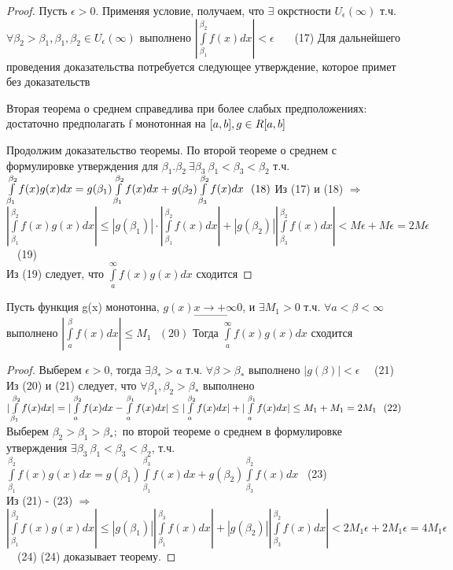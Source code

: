 \begin{proof}
	Пусть $\epsilon > 0$. Применяя условие, получаем, что $\exists$ окрстности $U_\epsilon(\infty)$ т.ч. $\forall \beta_2 > \beta_1, \beta_1,\beta_2 \in U_\epsilon(\infty)$ выполнено $|\int\limits_{\beta_1}^{\beta_2}{f(x)}dx| < \epsilon$  \ \ \ (17)
Для дальнейшего проведения доказательства потребуется следующее утверждение, которое примет без доказательств
\begin{assertion}
	Вторая теорема о среднем справедлива при более слабых предположениях: достаточно предполагать f монотонная на $[a,b], g \in R[a,b] \\$
\end{assertion}
	Продолжим доказательство теоремы. 
	По второй теореме о среднем с формулировке утверждения для $\beta_1.\beta_2 \ \exists \beta_3 \ \beta_1<\beta_3<\beta_2$
 т.ч. $\int\limits_{\beta_1}^{\beta_2}{f(x)g(x)}dx = g(\beta_1)\int\limits_{\beta_1}^{\beta_2}{f(x)}dx +g(\beta_2)\int\limits_{\beta_3}^{\beta_2}{f(x)}dx \ \ (18) \\$
 	Из (17) и (18) $\Rightarrow$ $|\int\limits_{\beta_1}^{\beta_2}{f(x)g(x)}dx|\leq |g(\beta_1)|\cdot|\int\limits_{\beta_1}^{\beta_2}{f(x)}dx| + |g(\beta_2)||\int\limits_{\beta_3}^{\beta_2}{f(x)}dx| < M\epsilon + M\epsilon = 2M\epsilon$ \ \ (19) \\
 	Из (19) следует, что $\int\limits_{a}^{\infty}{f(x)g(x)}dx$ сходится 
 \end{proof}

\begin{theorem}
	Пусть функция g(x) монотонна, $g(x) \underset{\to}{x \to +\infty}0$, и $\exists M_1 > 0$ т.ч. $\forall a< \beta < \infty$ выполнено $|\int\limits_{a}^{\beta}{f(x)}dx|\leq M_1 \ \ \ (20)$ Тогда $\int\limits_{a}^{\infty}{f(x)g(x)}dx$ сходится
\end{theorem}
\begin{proof}
	Выберем $\epsilon > 0$, тогда $\exists \beta_* > a$ т.ч. $\forall \beta > \beta_*$ выполнено $|g(\beta)|< \epsilon$ \ \ (21)
	Из (20) и (21) следует, что $\forall \beta_1,\beta_2 > \beta_*$ выполнено $|\int\limits_{\beta_1}^{\beta_2}{f(x)}dx|=|\int\limits_{a}^{\beta_2}{f(x)}dx - \int\limits_{a}^{\beta_1}{f(x)}dx|\leq |\int\limits_{a}^{\beta_2}{f(x)}dx|+|\int\limits_{a}^{\beta_1}{f(x)}dx| \leq M_1+M_1 = 2M_1 \ \ (22) \\$
	Выберем $\beta_2 > \beta_1 > \beta_*;$ по второй теореме о среднем в формулировке утверждения $\exists \beta_3 \ \beta_1<\beta_3<\beta_2$, т.ч. $\int\limits_{\beta_1}^{\beta_2}{f(x)g(x)}dx = g(\beta_1)\int\limits_{\beta_1}^{\beta_3}{f(x)}dx+g(\beta_2)\int\limits_{\beta_3}^{\beta_2}{f(x)}dx$ \ (23) \\
	Из (21) - (23) $\Rightarrow$ $|\int\limits_{\beta_1}^{\beta_2}{f(x)g(x)}dx| \leq |g(\beta_1)||\int\limits_{\beta_1}^{\beta_3}{f(x)}dx|+|g(\beta_2)||\int\limits_{\beta_3}^{\beta_2}{f(x)}dx| < 2M_1\epsilon + 2M_1\epsilon = 4M_1\epsilon$ \ \ (24)
	(24) доказывает теорему.
\end{proof} 
